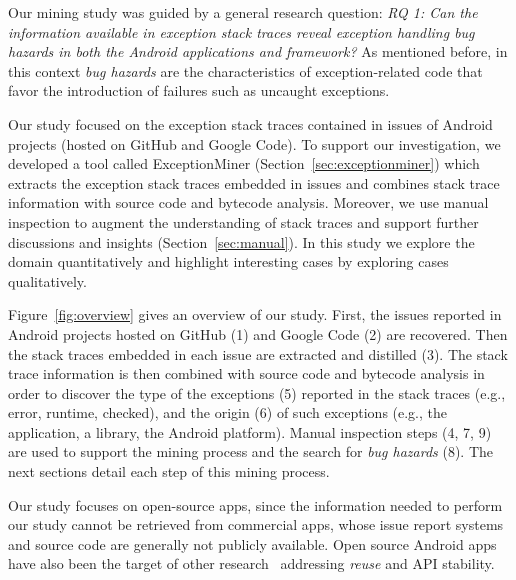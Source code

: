 Our mining study was guided by a general research question: \emph{RQ 1: Can the information available in exception stack traces 
 reveal exception handling \emph{bug hazards} in both the Android applications and framework?}
As mentioned before, in this context \emph{bug hazards} are the characteristics of exception-related code 
that favor the introduction of failures such as uncaught exceptions. 

Our study focused on the exception stack traces contained in issues of Android projects (hosted on GitHub and Google Code).
To support our investigation, we developed a tool called ExceptionMiner (Section~\ref{sec:exceptionminer})
which extracts the exception stack traces embedded in issues 
and combines stack trace information with source code and bytecode 
analysis. Moreover, we use manual inspection to augment
 the understanding of stack traces and support further discussions and insights (Section~\ref{sec:manual}).
In this study we explore the domain quantitatively and highlight interesting cases by 
exploring cases qualitatively. 


Figure~\ref{fig:overview} gives an overview of our study.
First,  the issues reported in Android projects hosted on GitHub (1) and Google Code (2) are recovered.
Then the stack traces embedded in each issue are extracted and distilled (3).
The stack trace information is then combined with source code and bytecode analysis in order to discover 
the type of the exceptions (5) reported in the stack traces (e.g., error, runtime, checked),
and the origin (6) of such exceptions 
(e.g., the application, a library, the Android platform). 
Manual inspection steps (4, 7, 9) are used to support the mining process  and 
the search for \emph{bug hazards}  (8). The next sections detail each step of this mining process.

Our study focuses on open-source apps, since the information needed to perform our study
cannot be retrieved from commercial apps, whose issue report systems and 
source code are generally not publicly available. 
Open source Android apps have also been the 
target of other research~\cite{Linar13,Ruiz12} addressing \emph{reuse} and API stability. 



